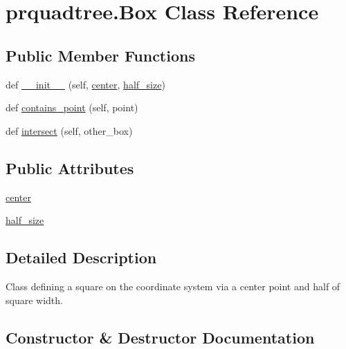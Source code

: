 \section{prquadtree.\+Box Class Reference}
\label{classprquadtree_1_1Box}
\subsection*{Public Member Functions}
\begin{DoxyCompactItemize}
\item 
def \hyperlink{classprquadtree_1_1Box_a0ff4532e81c55a7b41c35e85b0099168}{\+\_\+\+\_\+init\+\_\+\+\_\+} (self, \hyperlink{classprquadtree_1_1Box_a97475b97164cac388fc673e08ce2707e}{center}, \hyperlink{classprquadtree_1_1Box_ac40b9c6e566a2ca829a2e84e3f741294}{half\+\_\+size})
\item 
def \hyperlink{classprquadtree_1_1Box_a3f8878c3fa9a89b786103d31821304df}{contains\+\_\+point} (self, point)
\item 
def \hyperlink{classprquadtree_1_1Box_af8b0a29f1094809b6ae0793077d51648}{intersect} (self, other\+\_\+box)
\end{DoxyCompactItemize}
\subsection*{Public Attributes}
\begin{DoxyCompactItemize}
\item 
\hyperlink{classprquadtree_1_1Box_a97475b97164cac388fc673e08ce2707e}{center}
\item 
\hyperlink{classprquadtree_1_1Box_ac40b9c6e566a2ca829a2e84e3f741294}{half\+\_\+size}
\end{DoxyCompactItemize}


\subsection{Detailed Description}
\begin{DoxyVerb}Class defining a square on the coordinate system via a center point and
half of square width.
\end{DoxyVerb}
 

\subsection{Constructor \& Destructor Documentation}
